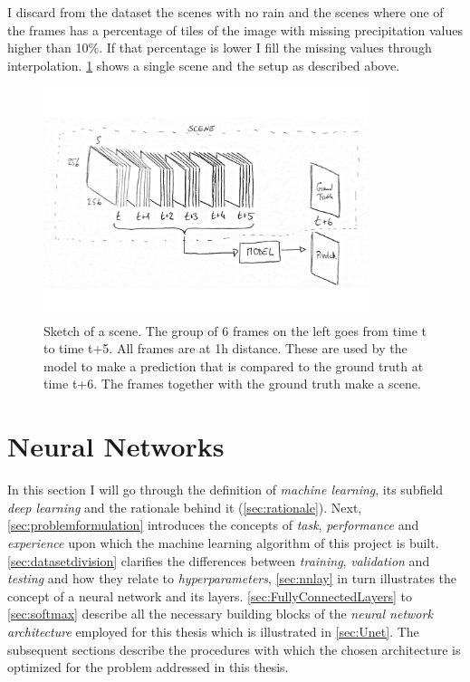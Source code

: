 I discard from the dataset the scenes with no rain and the scenes where one of the frames has a percentage of tiles of the image with missing precipitation values higher than 10\%. If that percentage is lower I fill the missing values through interpolation. \cref{fig:radnetdatasetexample} shows a single scene and the setup as described above.

\begin{figure}[h!]
    \centering
    \includegraphics[width=0.85\textwidth]{scene.pdf}
    \caption{Sketch of a scene. The group of 6 frames on the left goes from time t to time t+5. All frames are at 1h distance. These are used by the model to make a prediction that is compared to the ground truth at time t+6. The frames together with the ground truth make a scene.}
    \label{fig:radnetdatasetexample}
\end{figure}


\section{Neural Networks}\label{sec:neuralnet}
In this section I will go through the definition of \textit{machine learning}, its subfield \textit{deep learning} and the rationale behind it (\cref{sec:rationale}). Next, \cref{sec:problemformulation} introduces the concepts of \textit{task}, \textit{performance} and \textit{experience} upon which the machine learning algorithm of this project is built.
\cref{sec:datasetdivision} clarifies the differences between \textit{training}, \textit{validation} and \textit{testing} and how they relate to \textit{hyperparameters}, \cref{sec:nnlay} in turn illustrates the concept of a neural network and its layers. \cref{sec:FullyConnectedLayers} to \cref{sec:softmax} describe all the necessary building blocks of the \textit{neural network architecture} employed for this thesis which is illustrated in \cref{sec:Unet}. The subsequent sections describe the procedures with which the chosen architecture is optimized for the problem addressed in this thesis.

